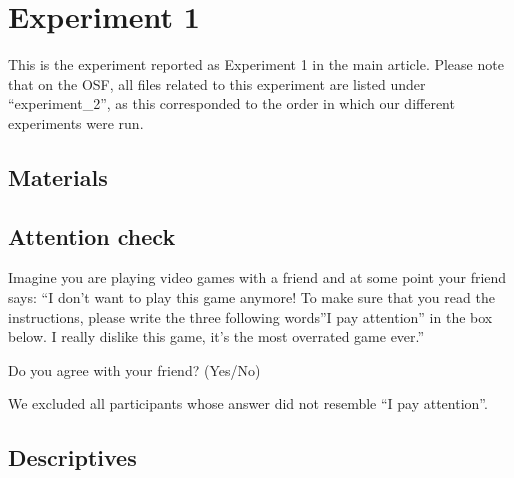 \documentclass[
  english,
  doc,floatsintext]{apa6}
\begin{document}
\clearpage

\section{Experiment 1}\label{exp1}

This is the experiment reported as Experiment 1 in the main article. Please note that on the OSF, all files related to this experiment are listed under ``experiment\_2'', as this corresponded to the order in which our different experiments were run.

\subsection{Materials}\label{materials-3}

\FloatBarrier

\subsection{Attention check}\label{attention-check-1}

Imagine you are playing video games with a friend and at some point your friend says: ``I don't want to play this game anymore! To make sure that you read the instructions, please write the three following words''I pay attention'' in the box below. I really dislike this game, it's the most overrated game ever.''

Do you agree with your friend? (Yes/No)

We excluded all participants whose answer did not resemble ``I pay attention''.

\subsection{Descriptives}\label{descriptives}

\begin{table}
\centering\centering
\caption{\label{tab:exp1-descriptives}Descriptives}
\centering
{}
\end{table}
\end{document}
